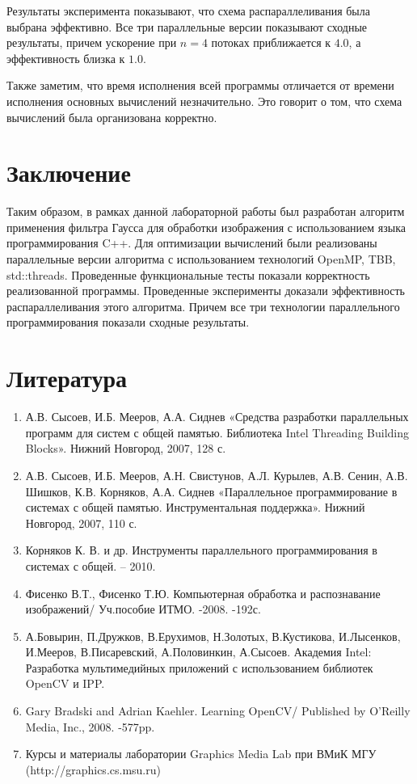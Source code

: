 \documentclass{article}
\begin{document}
\par
Результаты эксперимента показывают, что схема распараллеливания была выбрана эффективно. Все три параллельные версии показывают сходные результаты, причем ускорение при $n=4$ потоках приближается к $4.0$, а эффективность близка к $1.0$.
\par
Также заметим, что время исполнения всей программы отличается от времени исполнения основных вычислений незначительно. Это говорит о том, что схема вычислений была организована корректно.
\newpage

\section*{Заключение}
Таким образом, в рамках данной лабораторной работы был разработан алгоритм применения фильтра Гаусса для обработки изображения с использованием языка программирования C++. Для оптимизации вычислений были реализованы параллельные версии алгоритма с использованием технологий OpenMP, TBB, std::threads. Проведенные функциональные тесты показали корректность реализованной программы. Проведенные эксперименты доказали эффективность распараллеливания этого алгоритма. Причем все три технологии параллельного программирования показали сходные результаты.
\newpage

\section*{Литература}
\begin{enumerate}
\item А.В. Сысоев, И.Б. Мееров, А.А. Сиднев «Средства разработки параллельных программ для систем с общей памятью. Библиотека Intel Threading Building Blocks». Нижний Новгород, 2007, 128 с. 
\item А.В. Сысоев, И.Б. Мееров, А.Н. Свистунов, А.Л. Курылев, А.В. Сенин, А.В. Шишков, К.В. Корняков, А.А. Сиднев «Параллельное программирование в системах с общей
памятью. Инструментальная поддержка». Нижний Новгород, 2007, 110 с. 
\item Корняков К. В. и др. Инструменты параллельного программирования в системах с общей. – 2010.
\item Фисенко В.Т., Фисенко Т.Ю. Компьютерная обработка и распознавание изображений/ Уч.пособие ИТМО. -2008. -192с.
\item А.Бовырин, П.Дружков, В.Ерухимов, Н.Золотых, В.Кустикова, И.Лысенков, И.Мееров, В.Писаревский, А.Половинкин, А.Сысоев. Академия Intel: Разработка мультимедийных приложений с использованием библиотек OpenCV и IPP. 
\item Gary Bradski and Adrian Kaehler. Learning OpenCV/ Published by O’Reilly Media, Inc., 2008. -577pp.
\item Курсы и материалы лаборатории Graphics Media Lab при ВМиК МГУ (http://graphics.cs.msu.ru) 

\end{enumerate}
\end{document}
